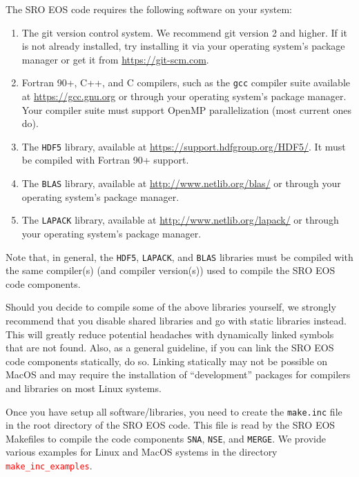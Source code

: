 \documentclass[letterpaper,11pt]{refart}
\begin{document}
The SRO EOS code requires the following software on your system:

\begin{enumerate}
\item The git version control system. We recommend git version 2 and
  higher. If it is not already installed, try installing it via
  your operating system's package manager or get it from
  \url{https://git-scm.com}.
 \item Fortran 90+, C++, and C compilers, such as the \verb|gcc|
   compiler suite available at \url{https://gcc.gnu.org} or
   through your operating system's package manager. Your compiler suite
   must support OpenMP parallelization (most current ones do).

 \item The \verb|HDF5| library, available at
   \url{https://support.hdfgroup.org/HDF5/}. It must be compiled with
   Fortran 90+ support.

 \item The \verb|BLAS| library, available at
   \url{http://www.netlib.org/blas/} or through your operating
   system's package manager.

 \item The \verb|LAPACK| library, available at
   \url{http://www.netlib.org/lapack/} or through your operating
   system's package manager.

\end{enumerate}
Note that, in general, the \verb|HDF5|, \verb|LAPACK|, and \verb|BLAS|
libraries must be compiled with the same compiler(s) (and compiler
version(s)) used to compile the SRO EOS code components.

Should you decide to compile some of the above libraries yourself, we
strongly recommend that you disable shared libraries and go with
static libraries instead. This will greatly reduce potential headaches
with dynamically linked symbols that are not found. Also, as a general
guideline, if you can link the SRO EOS code components statically, do
so. Linking statically may not be possible on MacOS and may require
the installation of ``development'' packages for compilers and libraries
on most Linux systems.

Once you have setup all software/libraries, you need to create the
\texttt{make.inc} file in the root directory of the SRO EOS code. This
file is read by the SRO EOS Makefiles to compile the code components
\texttt{SNA}, \texttt{NSE}, and \texttt{MERGE}. We provide various
examples for Linux and MacOS systems in the directory \textcolor{red}{\texttt{make\_inc\_examples}}.
\end{document}
